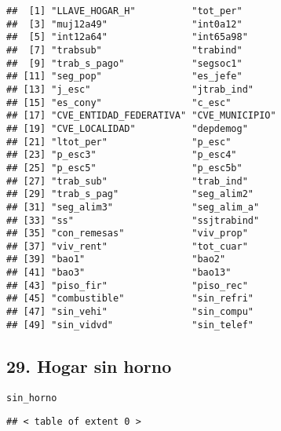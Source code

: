 \documentclass[11pt,]{article}
\newenvironment{Shaded}{\begin{snugshade}}{\end{snugshade}}
\newcommand{\KeywordTok}[1]{\textcolor[rgb]{0.13,0.29,0.53}{\textbf{#1}}}
\newcommand{\CommentTok}[1]{\textcolor[rgb]{0.56,0.35,0.01}{\textit{#1}}}
\newcommand{\OperatorTok}[1]{\textcolor[rgb]{0.81,0.36,0.00}{\textbf{#1}}}
\newcommand{\NormalTok}[1]{#1}
\begin{document}
\begin{verbatim}
##  [1] "LLAVE_HOGAR_H"          "tot_per"               
##  [3] "muj12a49"               "int0a12"               
##  [5] "int12a64"               "int65a98"              
##  [7] "trabsub"                "trabind"               
##  [9] "trab_s_pago"            "segsoc1"               
## [11] "seg_pop"                "es_jefe"               
## [13] "j_esc"                  "jtrab_ind"             
## [15] "es_cony"                "c_esc"                 
## [17] "CVE_ENTIDAD_FEDERATIVA" "CVE_MUNICIPIO"         
## [19] "CVE_LOCALIDAD"          "depdemog"              
## [21] "ltot_per"               "p_esc"                 
## [23] "p_esc3"                 "p_esc4"                
## [25] "p_esc5"                 "p_esc5b"               
## [27] "trab_sub"               "trab_ind"              
## [29] "trab_s_pag"             "seg_alim2"             
## [31] "seg_alim3"              "seg_alim_a"            
## [33] "ss"                     "ssjtrabind"            
## [35] "con_remesas"            "viv_prop"              
## [37] "viv_rent"               "tot_cuar"              
## [39] "bao1"                   "bao2"                  
## [41] "bao3"                   "bao13"                 
## [43] "piso_fir"               "piso_rec"              
## [45] "combustible"            "sin_refri"             
## [47] "sin_vehi"               "sin_compu"             
## [49] "sin_vidvd"              "sin_telef"
\end{verbatim}

\subsection{29. Hogar sin horno}\label{hogar-sin-horno}

\texttt{sin\_horno}

\begin{Shaded}
\end{Shaded}

\begin{verbatim}
## < table of extent 0 >
\end{verbatim}
\end{document}
